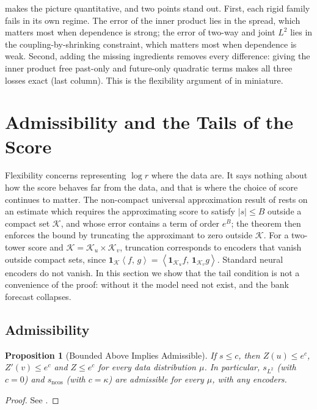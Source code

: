 \documentclass[11pt]{article}
\theoremstyle{plain}
\newtheorem{proposition}[theorem]{Proposition}
\theoremstyle{definition}
\theoremstyle{remark}
\newcommand{\KK}{\mathcal{K}}
\newcommand{\IP}[2]{\left\langle #1,\, #2 \right\rangle}
\newcommand{\abs}[1]{\left\lvert #1 \right\rvert}
\newcommand{\indicator}{\mathbf{1}}
\newcommand{\sncos}{s_{\mathrm{ncos}}}
\newcommand{\sltwo}{s_{L^2}}
\begin{document}
 makes the picture quantitative, and two points stand out.
First, each rigid family fails in its own regime. The error of the inner
product lies in the spread, which matters most when dependence is strong; the
error of two-way and joint $L^2$ lies in the coupling-by-shrinking
constraint, which matters most when dependence is weak. Second, adding the
missing ingredients removes every difference: giving the inner product free
past-only and future-only quadratic terms makes all three losses exact (last
column). This is the flexibility argument of  in
miniature.

\section{Admissibility and the Tails of the Score}
\label{sec:tails}

Flexibility concerns representing $\log r$ where the data are. It says
nothing about how the score behaves far from the data, and that is where the
choice of score continues to matter. The non-compact universal approximation
result of \cite[Thm.~3.3]{stuart2026expressivity} rests on an estimate
\cite[Prop.~A.3]{stuart2026expressivity} which requires the approximating
score to satisfy $\abs{s}\le B$ outside a compact set $\KK$, and whose error
contains a term of order $e^{B}$; the theorem then enforces the bound by
truncating the approximant to zero outside $\KK$. For a two-tower score and
$\KK=\KK_u\times\KK_v$, truncation corresponds to encoders that vanish
outside compact sets, since
$\indicator_{\KK}\IP{f}{g}=\IP{\indicator_{\KK_u}f}{\indicator_{\KK_v}g}$.
Standard neural encoders do not vanish. In this section we show that the tail
condition is not a convenience of the proof: without it the model need not
exist, and the bank forecast collapses.

\subsection{Admissibility}
\label{ssec:admissibility}

\begin{proposition}[Bounded Above Implies Admissible]
 \label{prop:bounded}
 If $s\le c$, then $Z(u)\le e^{c}$, $Z'(v)\le e^{c}$ and $Z\le e^{c}$ for
 every data distribution $\mu$. In particular, $\sltwo$ (with $c=0$) and
 $\sncos$ (with $c=\kappa$) are admissible for every $\mu$, with any
 encoders.
\end{proposition}
\begin{proof}
 See .
\end{proof}
\end{document}
